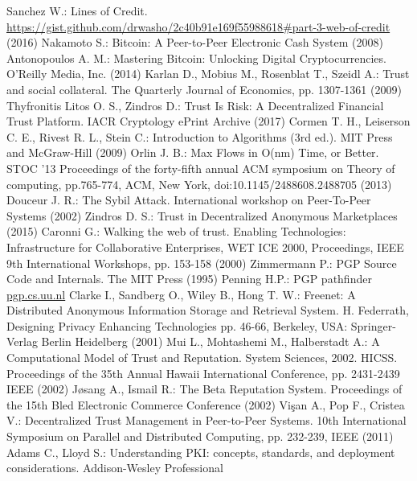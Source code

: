 \begin{thebibliography}{40}
  Sanchez W.: Lines of Credit. \url{https://gist.github.com/drwasho/2c40b91e169f55988618#part-3-web-of-credit} (2016)
  Nakamoto S.: Bitcoin: A Peer-to-Peer Electronic Cash System (2008)
  Antonopoulos A. M.: Mastering Bitcoin: Unlocking Digital Cryptocurrencies. O'Reilly Media, Inc. (2014)
  Karlan D., Mobius M., Rosenblat T., Szeidl A.: Trust and social collateral. The Quarterly Journal of Economics, pp.
  1307-1361 (2009)
  Thyfronitis Litos O. S., Zindros D.: Trust Is Risk: A Decentralized Financial Trust Platform. IACR Cryptology ePrint
  Archive (2017)
  Cormen T. H., Leiserson C. E., Rivest R. L., Stein C.: Introduction to Algorithms (3rd ed.). MIT Press and McGraw-Hill
  (2009)
  Orlin J. B.: Max Flows in O(nm) Time, or Better. STOC '13 Proceedings of the forty-fifth annual ACM symposium on Theory
  of computing, pp.765-774, ACM, New York, doi:10.1145/2488608.2488705 (2013)
  Douceur J. R.: The Sybil Attack. International workshop on Peer-To-Peer Systems (2002)
  Zindros D. S.: Trust in Decentralized Anonymous Marketplaces (2015)
  Caronni G.: Walking the web of trust. Enabling Technologies: Infrastructure for Collaborative Enterprises, WET ICE 2000,
  Proceedings, IEEE 9th International Workshops, pp. 153-158 (2000)
  Zimmermann P.: PGP Source Code and Internals. The MIT Press (1995)
  Penning H.P.: PGP pathfinder \url{pgp.cs.uu.nl}
  Clarke I., Sandberg O., Wiley B., Hong T. W.: Freenet: A Distributed Anonymous Information Storage and
  Retrieval System. H. Federrath, Designing Privacy Enhancing Technologies pp. 46-66, Berkeley, USA: Springer-Verlag
  Berlin Heidelberg (2001)
  Mui L., Mohtashemi M., Halberstadt A.: A Computational Model of Trust and Reputation. System Sciences, 2002. HICSS.
  Proceedings of the 35th Annual Hawaii International Conference, pp. 2431-2439 IEEE (2002)
  J\o{}sang A., Ismail R.: The Beta Reputation System. Proceedings of the 15th Bled Electronic Commerce Conference (2002)
  Vi\c{s}an A., Pop F., Cristea V.: Decentralized Trust Management in Peer-to-Peer Systems. 10th International Symposium on
  Parallel and Distributed Computing, pp. 232-239, IEEE (2011)
  Adams C., Lloyd S.: Understanding PKI: concepts, standards, and deployment considerations. Addison-Wesley Professional

\end{thebibliography}
